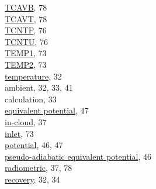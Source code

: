 \documentclass[
]{book}
\begin{document}
\href{./8-radiation-variables.html\#rstx}{TCAVB}, 78\\
\href{./8-radiation-variables.html\#rstx}{TCAVT}, 78\\
\href{./7-aerosol-particle-measurements.html\#tcntu-tcntp}{TCNTP}, 76\\
\href{./7-aerosol-particle-measurements.html\#tcntu-tcntp}{TCNTU}, 76\\
\href{./7-aerosol-particle-measurements.html\#cntemp}{TEMP1}, 73\\
\href{./7-aerosol-particle-measurements.html\#cntemp}{TEMP2}, 73\\
\href{./4-the-state-of-the-atmosphere.html\#ambient-t}{temperature}, 32\\
\hspace*{0.333em}\hspace*{0.333em}ambient, 32, 33, 41\\
\hspace*{0.333em}\hspace*{0.333em}calculation, 33\\
\hspace*{0.333em}\hspace*{0.333em}\href{./4-the-state-of-the-atmosphere.html\#thetae}{equivalent potential}, 47\\
\hspace*{0.333em}\hspace*{0.333em}\href{./4-the-state-of-the-atmosphere.html\#AT-ITR}{in-cloud}, 37\\
\hspace*{0.333em}\hspace*{0.333em}\href{./7-aerosol-particle-measurements.html\#cntemp}{inlet}, 73\\
\hspace*{0.333em}\hspace*{0.333em}\href{./4-the-state-of-the-atmosphere.html\#theta}{potential}, 46, 47\\
\hspace*{0.333em}\hspace*{0.333em}\href{./4-the-state-of-the-atmosphere.html\#thetae}{pseudo-adiabatic equivalent potential}, 46\\
\hspace*{0.333em}\hspace*{0.333em}\href{./4-the-state-of-the-atmosphere.html\#AT-ITR}{radiometric}, 37, 78\\
\hspace*{0.333em}\hspace*{0.333em}\href{./4-the-state-of-the-atmosphere.html\#recovery-t}{recovery}, 32, 34\\
\end{document}
